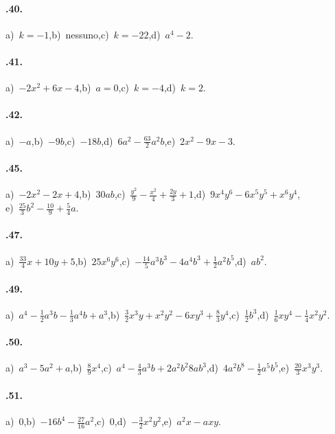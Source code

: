 \paragraph{\thechapter.40.}
a)~$k=-1$,\quad b)~nessuno,\quad c)~$k=-22$,\quad d)~$a^{4}-2$.
\paragraph{\thechapter.41.}
a)~$-2x^2+6x-4$,\quad b)~$a=0$,\quad c)~$k=-4$,\quad d)~$k=2$.
\paragraph{\thechapter.42.} a)~$-a$,\quad b)~$-9b$,\quad c)~$-18b$,\quad d)~$6a^{2}-\frac{63}{2}a^{2}b$,\quad e)~$2x^2-9x-3$.
\paragraph{\thechapter.45.} a)~$-2x^{2}-2x+4$,\quad b)~$30ab$,\quad c)~$\frac{y^{2}}{9}-\frac{x^{2}}{4}+\frac{2y}{3}+1$,\quad d)~$9x^{4}y^{6}-6x^{5}y^{5}+x^{6}y^{4}$,\protect\\ e)~$\frac{25}{3}b^{2}-\frac{10}{9}+\frac{5}{4}a$.
\paragraph{\thechapter.47.} a)~$\frac{33}{4}x+10y+5$,\quad b)~$25x^{6}y^{6}$,\quad c)~$-\frac{14}{5}a^{3}b^{3}-4a^{4}b^{3}+\frac{1}{2}a^{2}b^{5}$,\quad d)~$ab^{2}$. %
\paragraph{\thechapter.49.} a)~$a^{4}-\frac{1}{2}a^{3}b-\frac{1}{3}a^{4}b+a^{3}$,\quad b)~$\frac{3}{2}x^{3}y+x^{2}y^{2}-6{xy}^{3}+\frac{8}{3}y^{4}$,\quad c)~$\frac{1}{2}b^{3}$,\quad d)~$\frac{1}{6}xy^{4}-\frac{1}{4}x^{2}y^{2}$.
\paragraph{\thechapter.50.} a)~$a^{3}-5a^{2}+a$,\quad b)~$\frac{8}{9}x^{4}$,\quad c)~$a^{4}-\frac{4}{3}a^{3}b+2a^{2}b^{2}8ab^{3}$,\quad d)~$4a^{2}b^{8}-\frac{1}{2}a^{5}b^{5}$,\quad e)~$\frac{20}{3}x^{3}y^{3}$.
\paragraph{\thechapter.51.} a)~$0$,\quad b)~$-16b^{4}-\frac{27}{16}a^{2}$,\quad c)~$0$,\quad d)~$-\frac{3}{2}x^{2}y^{2}$,\quad e)~$a^{2}x-axy$.
